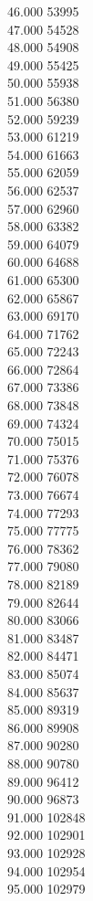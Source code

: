 { 46.000	53995 \\
 47.000	54528 \\
 48.000	54908 \\
 49.000	55425 \\
 50.000	55938 \\
 51.000	56380 \\
 52.000	59239 \\
 53.000	61219 \\
 54.000	61663 \\
 55.000	62059 \\
 56.000	62537 \\
 57.000	62960 \\
 58.000	63382 \\
 59.000	64079 \\
 60.000	64688 \\
 61.000	65300 \\
 62.000	65867 \\
 63.000	69170 \\
 64.000	71762 \\
 65.000	72243 \\
 66.000	72864 \\
 67.000	73386 \\
 68.000	73848 \\
 69.000	74324 \\
 70.000	75015 \\
 71.000	75376 \\
 72.000	76078 \\
 73.000	76674 \\
 74.000	77293 \\
 75.000	77775 \\
 76.000	78362 \\
 77.000	79080 \\
 78.000	82189 \\
 79.000	82644 \\
 80.000	83066 \\
 81.000	83487 \\
 82.000	84471 \\
 83.000	85074 \\
 84.000	85637 \\
 85.000	89319 \\
 86.000	89908 \\
 87.000	90280 \\
 88.000	90780 \\
 89.000	96412 \\
 90.000	96873 \\
 91.000	102848 \\
 92.000	102901 \\
 93.000	102928 \\
 94.000	102954 \\
 95.000	102979 \\
}
